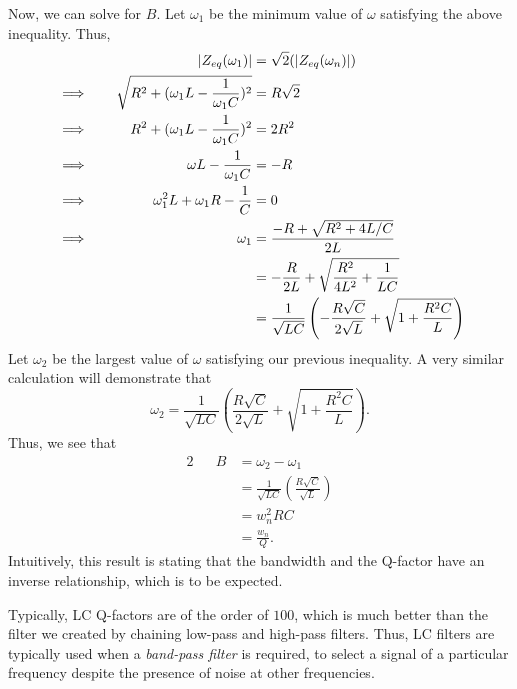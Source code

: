 \documentclass[letterpaper]{article}
\theoremstyle{remark}
\DeclarePairedDelimiter\abs{\lvert}{\rvert}%
\newcommand{\eqn}[1]{\begin{alignat*}{2}#1\end{alignat*}}
\newcommand*{\thus}{&\implies\quad&}
\begin{document}
Now, we can solve for $B$. Let $\omega_1$ be the minimum value of $\omega$ satisfying the above inequality. Thus,
\eqn{
    && \abs{Z_{eq}(\omega_1)} &= \sqrt{2} (\abs{Z_{eq}(\omega_n)}) \\
    \thus \sqrt{R^2 + (\omega_1 L - \frac{1}{\omega_1 C})^2} &= R\sqrt{2} \\
    \thus R^2 + (\omega_1 L - \frac{1}{\omega_1 C})^2 &= 2R^2 \\
    \thus \omega L - \frac{1}{\omega_1 C} &= -R \\
    \thus \omega_1^2 L + \omega_1 R - \frac{1}{C} &= 0 \\
    \thus \omega_1 &= \frac{-R + \sqrt{R^2 + 4L / C}}{2L} \\
    &&&= -\frac{R}{2L} + \sqrt{\frac{R^2}{4L^2} + \frac{1}{LC}} \\
    &&&= \frac{1}{\sqrt{LC}} \left(-\frac{R\sqrt{C}}{2\sqrt{L}} + \sqrt{1 + \frac{R^2C}{L}} \right) \\
}
Let $\omega_2$ be the largest value of $\omega$ satisfying our previous inequality. A very similar calculation will demonstrate that
\[
    \omega_2 = \frac{1}{\sqrt{LC}} \left(\frac{R\sqrt{C}}{2\sqrt{L}} + \sqrt{1 + \frac{R^2C}{L}} \right).
\]
Thus, we see that
\eqn{
    && B &= \omega_2 - \omega_1 \\
    &&&= \frac{1}{\sqrt{LC}} \left(\frac{R\sqrt{C}}{\sqrt{L}} \right) \\
    &&&= w_n^2 RC \\
    &&&= \frac{w_n}{Q}.
}
Intuitively, this result is stating that the bandwidth and the Q-factor have an inverse relationship, which is to be expected.

Typically, LC Q-factors are of the order of $100$, which is much better than the filter we created by chaining low-pass and high-pass filters. Thus, LC filters are typically used when a \emph{band-pass filter} is required, to select a signal of a particular frequency despite the presence of noise at other frequencies.
\end{document}
